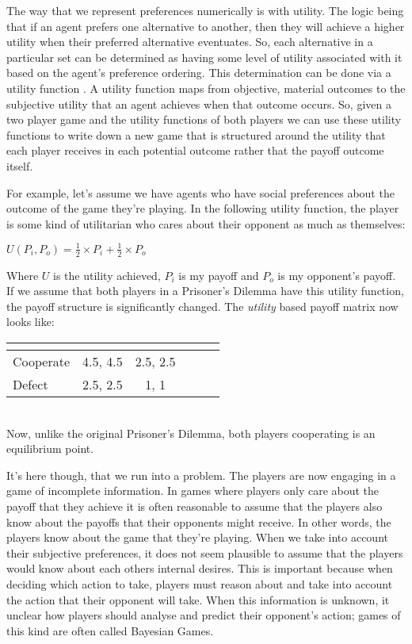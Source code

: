 \documentclass[11pt]{article}
\newcommand*{\np}{\par\noindent\newline}
\begin{document}
\np The way that we represent preferences numerically is with utility. The logic being that if an agent prefers one
alternative to another, then they will achieve a higher utility when their preferred alternative eventuates. So, each
alternative in a particular set can be determined as having some level of utility associated with it based on the
agent's preference ordering. This determination can be done via a utility function \citep{angner_course_2012}. A utility
function maps from objective, material outcomes to the subjective utility that an agent achieves when that outcome
occurs. So, given a two player game and the utility functions of both players we can use these utility functions
to write down a new game that is structured around the utility that each player receives in each potential outcome
rather that the payoff outcome itself.

\np For example, let's assume we have agents who have social preferences about the outcome of the game they're playing.
In the following utility function, the player is some kind of utilitarian who cares about their opponent as much as themselves:
\begin{center}
	\(U(P_i, P_o) = \frac{1}{2} \times P_i + \frac{1}{2} \times P_o\) 
\end{center}
Where $U$ is the utility achieved, $P_i$ is my payoff and $P_o$ is my opponent's payoff.
If we assume that both players in a Prisoner's Dilemma have this utility function, the payoff structure is significantly
changed. The \textit{utility} based payoff matrix now looks like:
\newline
\begin{center}
	\begin{tabular}{|l||*{5}{c|}}\hline
		\label{utility_prisoner}
		\backslashbox{Prisoner A}{Prisoner B}
		&\makebox[7em]{Cooperate}&\makebox[7em]{Defect}\\\hline\hline
		Cooperate & 4.5, 4.5 & 2.5, 2.5\\\hline
		Defect & 2.5, 2.5 & 1, 1 \\\hline
	\end{tabular}
\end{center}\mbox{}\\
Now, unlike the original Prisoner's Dilemma, both players cooperating is an equilibrium point.

\np It's here though, that we run into a problem. The players are now engaging in a game of incomplete information.
In games where players only care about the payoff that they achieve it is often reasonable to assume that the players
also know about the payoffs that their opponents might receive. In other words, the players know about the game that
they're playing. When we take into account their subjective preferences, it does not seem plausible to assume that the
players would know about each others internal desires. This is important because when deciding which action to take,
players must reason about and take into account the action that their opponent will take. When this information is
unknown, it unclear how players should analyse and predict their opponent's action; games of this kind are often called Bayesian Games.
\end{document}
